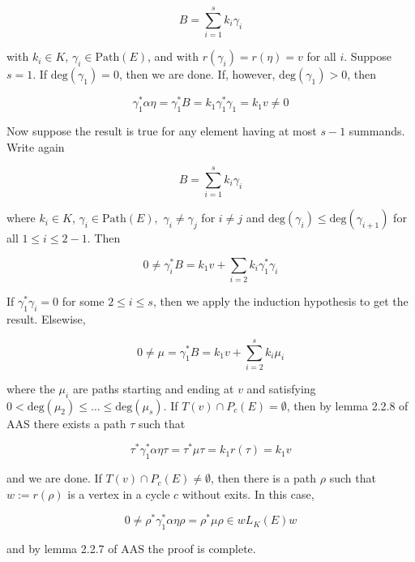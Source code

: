 \begin{solution}
    $$B=\sum_{i=1}^sk_i\gamma_i$$

    with $k_i\in K$, $\gamma_i\in\text{Path}(E)$, and with $r(\gamma_i)=r(\eta)=v$ for all $i$. Suppose
    $s=1$. If $\text{deg}(\gamma_1)=0$, then we are done. If, however, $\text{deg}(\gamma_1)>0$, then
    
    $$\gamma_1^*\alpha\eta=\gamma_1^*B=k_1\gamma_1^*\gamma_1=k_1v\neq0$$

    Now suppose the result is true for any element having at most $s-1$ summands. Write again
    
    $$B=\sum_{i=1}^sk_i\gamma_i$$
    
    where $k_i\in K$, $\gamma_i\in\text{Path}(E),$ $\gamma_i\neq\gamma_j$ for $i\neq j$ and 
    $\text{deg}(\gamma_i)\leq\text{deg}(\gamma_{i+1})$ for all $1\leq i\leq 2-1$. Then

    $$0\neq\gamma_i^*B=k_1v+\sum_{i=2}k_i\gamma_1^*\gamma_i$$
    
    If $\gamma_1^*\gamma_i=0$ for some $2\leq i\leq s$, then we apply the induction hypothesis to get
    the result. Elsewise,
    
    $$0\neq\mu=\gamma_1^*B=k_1v+\sum_{i=2}^sk_i\mu_i$$
    
    where the $\mu_i$ are paths starting and ending at $v$ and satisfying
    $0<\text{deg}(\mu_2)\leq\ldots\leq\text{deg}(\mu_s)$. If $T(v)\cap P_c(E)=\emptyset$, then by lemma
    2.2.8 of AAS there exists a path $\tau$ such that
    
    $$\tau^*\gamma_1^*\alpha\eta\tau=\tau^*\mu\tau=k_1r(\tau)=k_1v$$
    
    and we are done. If $T(v)\cap P_c(E)\neq\emptyset$, then there is a path $\rho$ such that
    $w:=r(\rho)$ is a vertex in a cycle $c$ without exits. In this case,
    
    $$0\neq\rho^*\gamma_1^*\alpha\eta\rho=\rho^*\mu\rho\in wL_K(E)w$$

    and by lemma 2.2.7 of AAS the proof is complete.

\end{solution}

